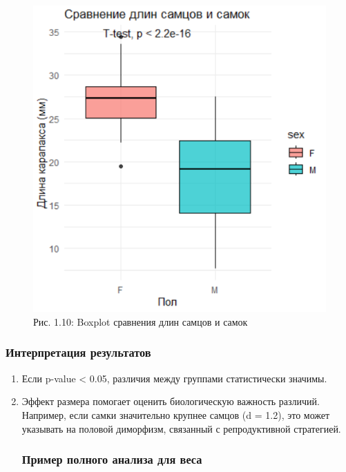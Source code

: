 \documentclass[
  letterpaper,
  DIV=11,
  numbers=noendperiod]{scrreprt}
\begin{document}
\begin{figure}[H]

{\centering \includegraphics[width=0.6\linewidth,height=\textheight,keepaspectratio]{images/ttest_shrimp.PNG}

}

\caption{Рис. 1.10: Boxplot сравнения длин самцов и самок}

\end{figure}%

\subsubsection{\texorpdfstring{\textbf{Интерпретация
результатов}}{Интерпретация результатов}}\label{ux438ux43dux442ux435ux440ux43fux440ux435ux442ux430ux446ux438ux44f-ux440ux435ux437ux443ux43bux44cux442ux430ux442ux43eux432}

\begin{enumerate}
\def\labelenumi{\arabic{enumi}.}
\item
  Если p-value \textless{} 0.05, различия между группами статистически
  значимы.
\item
  Эффект размера помогает оценить биологическую важность различий.
  Например, если самки значительно крупнее самцов (d = 1.2), это может
  указывать на половой диморфизм, связанный с репродуктивной стратегией.

  \subsubsection{\texorpdfstring{\textbf{Пример полного анализа для
  веса}}{Пример полного анализа для веса}}\label{ux43fux440ux438ux43cux435ux440-ux43fux43eux43bux43dux43eux433ux43e-ux430ux43dux430ux43bux438ux437ux430-ux434ux43bux44f-ux432ux435ux441ux430}
\end{enumerate}
\end{document}
